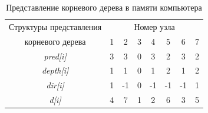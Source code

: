 \documentclass{article}
\begin{document}
\begin{table} [h]
  \centering
  \caption{Представление корневого дерева в памяти компьютера}
  \begin{tabular}{|c|c|c|c|c|c|c|c|}
    \hline
    \cellcolor{gray!75}Структуры представления & \multicolumn{7}{|c|}{\cellcolor{gray!50} Номер узла} \\
    \arrayrulecolor{gray!75}\cline{1-2}
    \arrayrulecolor{black} \cline{2-8}
    \cellcolor{gray!75}корневого дерева & \cellcolor{gray!35}1 & \cellcolor{gray!35}2 & \cellcolor{gray!35}3 & \cellcolor{gray!35}4 & \cellcolor{gray!35}5 & \cellcolor{gray!35}6 & \cellcolor{gray!35}7 \\
    \hline
    \cellcolor{gray!50}\textit{pred[i]} & 3 & 3 & 0 & 3 & 2 & 3 & 2 \\
    \hline
    \cellcolor{gray!50}\textit{depth[i]} & 1 & 1 & 0 & 1 & 2 & 1 & 2 \\
    \hline
    \cellcolor{gray!50}\textit{dir[i]} & 1 & -1 & 0 & -1 & -1 & -1 & 1 \\
    \hline
    \cellcolor{gray!50}\textit{d[i]} & 4 & 7 & 1 & 2 & 6 & 3 & 5 \\
    \hline
  \end{tabular}
\end{table}

\newpage
\end{document}
